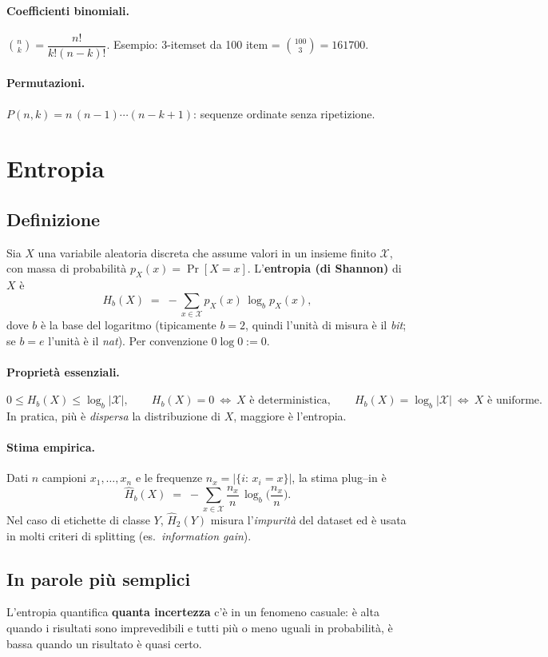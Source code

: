 \paragraph{Coefficienti binomiali.} \(\binom{n}{k}=\dfrac{n!}{k!(n-k)!}\). Esempio: 3-itemset da 100 item = \(\binom{100}{3}=161700\).
\paragraph{Permutazioni.} \(P(n,k)=n\,(n-1)\cdots(n-k+1)\): sequenze ordinate senza ripetizione.

\section{Entropia}\label{sec:entropy}

\subsection{Definizione}
Sia \(X\) una variabile aleatoria discreta che assume valori in un insieme finito \(\mathcal{X}\), con massa di probabilità \(p_X(x)=\Pr[X=x]\).
L'\textbf{entropia (di Shannon)} di \(X\) è
\[
H_b(X)\;=\;-\sum_{x\in\mathcal{X}} p_X(x)\,\log_b p_X(x),
\]
dove \(b\) è la base del logaritmo (tipicamente \(b=2\), quindi l'unità di misura è il \emph{bit}; se \(b=e\) l'unità è il \emph{nat}). Per convenzione \(0\log 0:=0\).

\paragraph{Proprietà essenziali.}
\[
0 \le H_b(X) \le \log_b |\mathcal{X}|,\qquad
H_b(X)=0 \ \Leftrightarrow\ X \text{ è deterministica},\qquad
H_b(X)=\log_b|\mathcal{X}| \ \Leftrightarrow\ X \text{ è uniforme}.
\]
In pratica, più è \emph{dispersa} la distribuzione di \(X\), maggiore è l'entropia.

\paragraph{Stima empirica.}
Dati \(n\) campioni \(x_1,\dots,x_n\) e le frequenze \(n_x=|\{i:\,x_i=x\}|\), la stima plug--in è
\[
\widehat{H}_b(X)\;=\;-\sum_{x\in\mathcal{X}} \frac{n_x}{n}\,\log_b\!\Big(\frac{n_x}{n}\Big).
\]
Nel caso di etichette di classe \(Y\), \(\widehat{H}_2(Y)\) misura l'\emph{impurità} del dataset ed è usata in molti criteri di splitting (es.\ \emph{information gain}).

\subsection{In parole più semplici}
L'entropia quantifica \textbf{quanta incertezza} c'è in un fenomeno casuale: è alta quando i risultati sono imprevedibili e tutti più o meno uguali in probabilità, è bassa quando un risultato è quasi certo.

